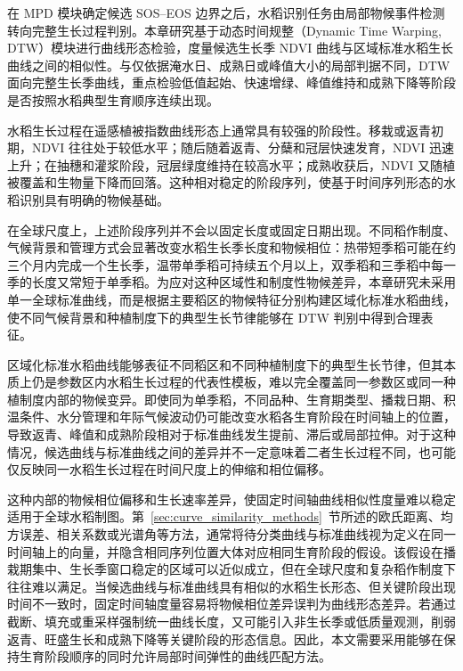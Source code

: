 在 MPD 模块确定候选 SOS--EOS 边界之后，水稻识别任务由局部物候事件检测转向完整生长过程判别。本章研究基于动态时间规整（Dynamic Time Warping, DTW）模块进行曲线形态检验，度量候选生长季 NDVI 曲线与区域标准水稻生长曲线之间的相似性。与仅依据淹水日、成熟日或峰值大小的局部判据不同，DTW 面向完整生长季曲线，重点检验低值起始、快速增绿、峰值维持和成熟下降等阶段是否按照水稻典型生育顺序连续出现。

水稻生长过程在遥感植被指数曲线形态上通常具有较强的阶段性。移栽或返青初期，NDVI 往往处于较低水平；随后随着返青、分蘖和冠层快速发育，NDVI 迅速上升；在抽穗和灌浆阶段，冠层绿度维持在较高水平；成熟收获后，NDVI 又随植被覆盖和生物量下降而回落。这种相对稳定的阶段序列，使基于时间序列形态的水稻识别具有明确的物候基础。

在全球尺度上，上述阶段序列并不会以固定长度或固定日期出现。不同稻作制度、气候背景和管理方式会显著改变水稻生长季长度和物候相位：热带短季稻可能在约三个月内完成一个生长季，温带单季稻可持续五个月以上，双季稻和三季稻中每一季的长度又常短于单季稻\cite{Laborte2017SciData,Mishra2021IJAEO}。为应对这种区域性和制度性物候差异，本章研究未采用单一全球标准曲线，而是根据主要稻区的物候特征分别构建区域化标准水稻曲线，使不同气候背景和种植制度下的典型生长节律能够在 DTW 判别中得到合理表征。

区域化标准水稻曲线能够表征不同稻区和不同种植制度下的典型生长节律，但其本质上仍是参数区内水稻生长过程的代表性模板，难以完全覆盖同一参数区或同一种植制度内部的物候变异。即使同为单季稻，不同品种、生育期类型、播栽日期、积温条件、水分管理和年际气候波动仍可能改变水稻各生育阶段在时间轴上的位置，导致返青、峰值和成熟阶段相对于标准曲线发生提前、滞后或局部拉伸。对于这种情况，候选曲线与标准曲线之间的差异并不一定意味着二者生长过程不同，也可能仅反映同一水稻生长过程在时间尺度上的伸缩和相位偏移。

这种内部的物候相位偏移和生长速率差异，使固定时间轴曲线相似性度量难以稳定适用于全球水稻制图。第~\ref{sec:curve_similarity_methods}~节所述的欧氏距离、均方误差、相关系数或光谱角等方法，通常将待分类曲线与标准曲线视为定义在同一时间轴上的向量，并隐含相同序列位置大体对应相同生育阶段的假设。该假设在播栽期集中、生长季窗口稳定的区域可以近似成立，但在全球尺度和复杂稻作制度下往往难以满足。当候选曲线与标准曲线具有相似的水稻生长形态、但关键阶段出现时间不一致时，固定时间轴度量容易将物候相位差异误判为曲线形态差异。若通过截断、填充或重采样强制统一曲线长度，又可能引入非生长季或低质量观测，削弱返青、旺盛生长和成熟下降等关键阶段的形态信息。因此，本文需要采用能够在保持生育阶段顺序的同时允许局部时间弹性的曲线匹配方法。

